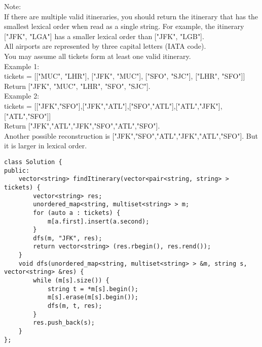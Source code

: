 Note:\\
    If there are multiple valid itineraries, you should return the itinerary that has the smallest lexical order when read as a single string. For example, the itinerary ["JFK", "LGA"] has a smaller lexical order than ["JFK", "LGB"].\\
    All airports are represented by three capital letters (IATA code).\\
    You may assume all tickets form at least one valid itinerary.\\

Example 1:\\
tickets = [["MUC", "LHR"], ["JFK", "MUC"], ["SFO", "SJC"], ["LHR", "SFO"]]\\
Return ["JFK", "MUC", "LHR", "SFO", "SJC"].\\

Example 2:\\
tickets = [["JFK","SFO"],["JFK","ATL"],["SFO","ATL"],["ATL","JFK"],["ATL","SFO"]]\\
Return ["JFK","ATL","JFK","SFO","ATL","SFO"].\\
Another possible reconstruction is ["JFK","SFO","ATL","JFK","ATL","SFO"]. But it is larger in lexical order. \\

\begin{lstlisting}
class Solution {
public:
    vector<string> findItinerary(vector<pair<string, string> > tickets) {
        vector<string> res;
        unordered_map<string, multiset<string> > m;
        for (auto a : tickets) {
            m[a.first].insert(a.second);
        }
        dfs(m, "JFK", res);
        return vector<string> (res.rbegin(), res.rend());
    }
    void dfs(unordered_map<string, multiset<string> > &m, string s, vector<string> &res) {
        while (m[s].size()) {
            string t = *m[s].begin();
            m[s].erase(m[s].begin());
            dfs(m, t, res);
        }
        res.push_back(s);
    }
};
\end{lstlisting}

